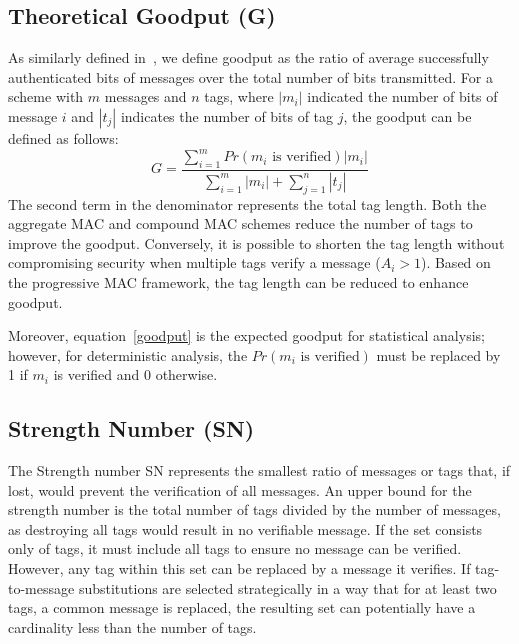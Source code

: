 \subsection{Theoretical Goodput (G)}
As similarly defined in~\cite{when_And_How_Aggregate_In_Lossy_Channel}, we define goodput as the ratio of average successfully authenticated bits of messages over the total number of bits transmitted. For a scheme with $m$ messages and $n$ tags, where $|m_i|$ indicated the number of bits of message $i$ and $|t_j|$ indicates the number of bits of tag $j$, the goodput can be defined as follows:
\begin{equation}\label{goodput}
    G = \frac{\sum_{i  = 1}^m Pr(m_i \text{ is verified})|m_i|}{\sum_{i  = 1}^m|m_i| + \sum_{j = 1}^n|t_j|}
\end{equation}
The second term in the denominator represents the total tag length. Both the aggregate MAC and compound MAC schemes reduce the number of tags to improve the goodput. Conversely, it is possible to shorten the tag length without compromising security when multiple tags verify a message (\(A_i > 1\)). Based on the progressive MAC framework, the tag length can be reduced to enhance goodput. 

Moreover, equation~\eqref{goodput} is the expected goodput for statistical analysis; however, for deterministic analysis, the $Pr(m_i \text{ is verified})$ must be replaced by 1 if $m_i$ is verified and 0 otherwise.


\subsection{Strength Number (SN)}
The Strength number SN represents the smallest ratio of messages or tags that, if lost, would prevent the verification of all messages. An upper bound for the strength number is the total number of tags divided by the number of messages, as destroying all tags would result in no verifiable message. If the set consists only of tags, it must include all tags to ensure no message can be verified. However, any tag within this set can be replaced by a message it verifies. If tag-to-message substitutions are selected strategically in a way that for at least two tags, a common message is replaced, the resulting set can potentially have a cardinality less than the number of tags.


